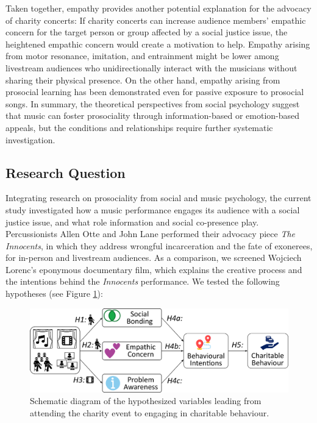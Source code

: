 \documentclass[
  man,floatsintext]{apa6}
\begin{document}
Taken together, empathy provides another potential explanation for the advocacy of charity concerts: If charity concerts can increase audience members' empathic concern for the target person or group affected by a social justice issue, the heightened empathic concern would create a motivation to help. Empathy arising from motor resonance, imitation, and entrainment might be lower among livestream audiences who unidirectionally interact with the musicians without sharing their physical presence. On the other hand, empathy arising from prosocial learning has been demonstrated even for passive exposure to prosocial songs. In summary, the theoretical perspectives from social psychology suggest that music can foster prosociality through information-based or emotion-based appeals, but the conditions and relationships require further systematic investigation.

\subsection{Research Question}\label{research-question}

Integrating research on prosociality from social and music psychology, the current study investigated how a music performance engages its audience with a social justice issue, and what role information and social co-presence play. Percussionists Allen Otte and John Lane performed their advocacy piece \textit{The Innocents}, in which they address wrongful incarceration and the fate of exonerees, for in-person and livestream audiences. As a comparison, we screened Wojciech Lorenc's eponymous documentary film, which explains the creative process and the intentions behind the \textit{Innocents} performance. We tested the following hypotheses (see Figure \ref{fig:hypotheses}):



\begin{figure}
\includegraphics[width=1\linewidth]{images/Innocents_Diagram_Hypotheses_v2} \caption{Schematic diagram of the hypothesized variables leading from attending the charity event to engaging in charitable behaviour.}\label{fig:hypotheses}
\end{figure}
\end{document}
